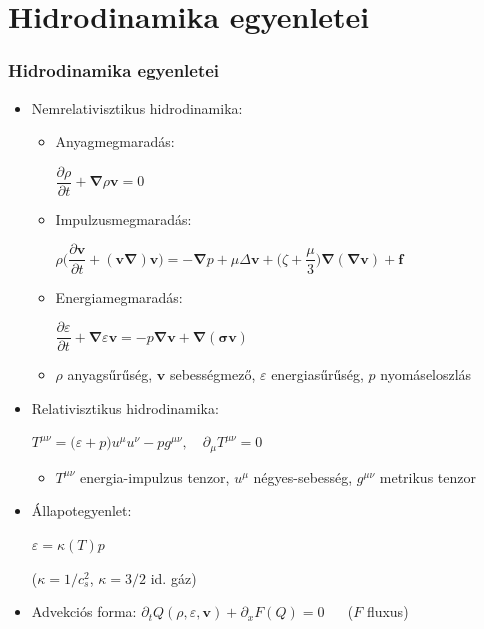 \documentclass{beamer}
\begin{document}
\section{Hidrodinamika egyenletei}
\begin{frame}[noframenumbering]
\frametitle{Hidrodinamika egyenletei}
\begin{itemize}
\item<1-> Nemrelativisztikus hidrodinamika:
\begin{itemize}
\item<1-> Anyagmegmaradás:\quad \begin{large}$\dfrac{\partial \rho}{\partial t} + \bm{\nabla}\rho\bm{v}=0$\end{large}
\item<1-> Impulzusmegmaradás:\quad \begin{center}\begin{large}$\rho\Big(\dfrac{\partial \bm{v}}{\partial t}+(\bm{v\nabla})\bm{v}\Big)=-\bm{\nabla}p +\mu\Delta\bm{v}+\Big(\zeta+\dfrac{\mu}{3}\Big)\bm{\nabla}(\bm{\nabla v})+\bm{f}$\end{large}\end{center}
\item<1-> Energiamegmaradás: \quad\begin{large}$\dfrac{\partial \varepsilon}{\partial t}+\bm{\nabla}\varepsilon\bm{v}=-p\bm{\nabla v}+\bm{\nabla(\sigma v)}$\end{large}
\item<1-> $\rho$ anyagsűrűség, $\bm{v}$ sebességmező, $\varepsilon$ energiasűrűség, $p$ nyomáseloszlás
\end{itemize}

\item<1-> Relativisztikus hidrodinamika:
\begin{Large}
\begin{center}$T^{\mu\nu}=\big(\varepsilon+p\big)u^\mu u^\nu-pg^{\mu\nu},\quad \partial_\mu T^{\mu\nu}=0$\end{center}
\end{Large}
\begin{itemize}
\item<1-> $T^{\mu\nu}$ energia-impulzus tenzor, $u^\mu$ négyes-sebesség, $g^{\mu\nu}$ metrikus tenzor
\end{itemize}

\item<1-> Állapotegyenlet:\quad \begin{large}$\varepsilon=\kappa(T)p\quad$\end{large} ($\kappa=1/c_s^2$, $\kappa=3/2$ id. gáz)

\item<1-> Advekciós forma: $\partial_t Q(\rho, \varepsilon, \bm{v})+\partial_x F(Q)=0$ $\quad$ ($F$ fluxus)

\end{itemize}
\end{frame}
\end{document}
